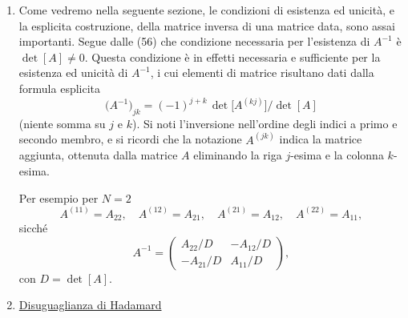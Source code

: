 \documentclass[11pt, a4paper]{book}
\numberwithin{equation}{section}
\begin{document}
\begin{enumerate}
\item Come vedremo nella seguente sezione, le condizioni di esistenza ed unicità, e la esplicita costruzione, della matrice inversa di una matrice data, sono assai importanti. Segue dalle (56) che condizione necessaria per l'esistenza di $A^{-1}$ è $\det[A] \neq 0$. Questa condizione è in effetti necessaria e sufficiente per la esistenza ed unicità di $A^{-1}$, i cui elementi di matrice risultano dati dalla formula esplicita
\begin{equation}
    \bigl(A^{-1}\bigr)_{jk} = (-1)^{j+k}\, \det\bigl[A^{(kj)}\bigr] \Big/ \det[A]
    \tag{57}
\end{equation}
(niente somma su $j$ e $k$). Si noti l'inversione nell'ordine degli indici a primo e secondo membro, e si ricordi che la notazione $A^{(jk)}$ indica la matrice aggiunta, ottenuta dalla matrice $A$ eliminando la riga $j$-esima e la colonna $k$-esima.

Per esempio per $N = 2$
\begin{equation}
    A^{(11)} = A_{22},\quad A^{(12)} = A_{21},\quad A^{(21)} = A_{12},\quad A^{(22)} = A_{11},
    \tag{58}
\end{equation}
sicché
\begin{equation}
    A^{-1} =
    \begin{pmatrix}
        A_{22}/D & -A_{12}/D \\
        -A_{21}/D & A_{11}/D
    \end{pmatrix},
    \tag{59}
\end{equation}
con $D = \det[A]$.

\item \underline{Disuguaglianza di Hadamard}


\end{enumerate}
\end{document}
